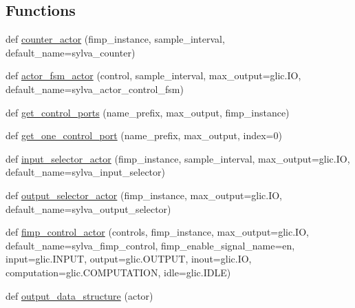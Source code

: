 \subsection*{Functions}
\begin{DoxyCompactItemize}
\item 
def \hyperlink{namespacesylva_1_1code__generation_1_1air_a50394584613c57985bc89c8fa14a058f}{counter\+\_\+actor} (fimp\+\_\+instance, sample\+\_\+interval, default\+\_\+name=\textquotesingle{}sylva\+\_\+counter\textquotesingle{})
\item 
def \hyperlink{namespacesylva_1_1code__generation_1_1air_a29263a2d50cecb3cf4e5aa3b684c4666}{actor\+\_\+fsm\+\_\+actor} (control, sample\+\_\+interval, max\+\_\+output=glic.\+IO, default\+\_\+name=\textquotesingle{}sylva\+\_\+actor\+\_\+control\+\_\+fsm\textquotesingle{})
\item 
def \hyperlink{namespacesylva_1_1code__generation_1_1air_a71d379169f113b29c326aa9f70c6d47e}{get\+\_\+control\+\_\+ports} (name\+\_\+prefix, max\+\_\+output, fimp\+\_\+instance)
\item 
def \hyperlink{namespacesylva_1_1code__generation_1_1air_aab89db05c96a30b48a7afc9c857af6d7}{get\+\_\+one\+\_\+control\+\_\+port} (name\+\_\+prefix, max\+\_\+output, index=0)
\item 
def \hyperlink{namespacesylva_1_1code__generation_1_1air_aaa165d9fb26a2af721734a446b1549fa}{input\+\_\+selector\+\_\+actor} (fimp\+\_\+instance, sample\+\_\+interval, max\+\_\+output=glic.\+IO, default\+\_\+name=\textquotesingle{}sylva\+\_\+input\+\_\+selector\textquotesingle{})
\item 
def \hyperlink{namespacesylva_1_1code__generation_1_1air_a3e01248fb07a8e940919fe35ddcd684e}{output\+\_\+selector\+\_\+actor} (fimp\+\_\+instance, max\+\_\+output=glic.\+IO, default\+\_\+name=\textquotesingle{}sylva\+\_\+output\+\_\+selector\textquotesingle{})
\item 
def \hyperlink{namespacesylva_1_1code__generation_1_1air_a2ea6ae18c1f30dcbc16f01d32d092979}{fimp\+\_\+control\+\_\+actor} (controls, fimp\+\_\+instance, max\+\_\+output=glic.\+IO, default\+\_\+name=\textquotesingle{}sylva\+\_\+fimp\+\_\+control\textquotesingle{}, fimp\+\_\+enable\+\_\+signal\+\_\+name=\textquotesingle{}en\textquotesingle{}, input=glic.\+I\+N\+P\+UT, output=glic.\+O\+U\+T\+P\+UT, inout=glic.\+IO, computation=glic.\+C\+O\+M\+P\+U\+T\+A\+T\+I\+ON, idle=glic.\+I\+D\+LE)
\item 
def \hyperlink{namespacesylva_1_1code__generation_1_1air_a83186b3b999778cee36ac81d42b2cd44}{output\+\_\+data\+\_\+structure} (actor)

\end{DoxyCompactItemize}
